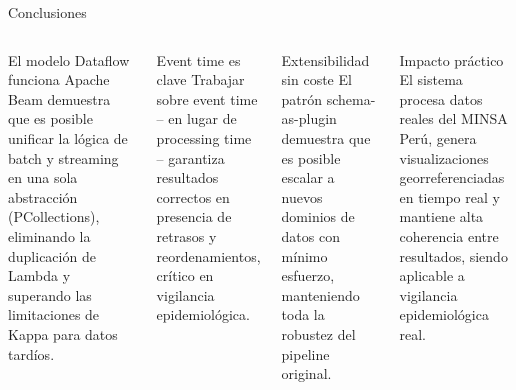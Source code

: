 \documentclass[aspectratio=169, 10pt]{beamer}
\begin{document}
\begin{frame}{Conclusiones}
  \begin{columns}[t]
      \begin{block}{El modelo Dataflow funciona}
        \small
        Apache Beam demuestra que es posible unificar
        la l\'ogica de batch y streaming en una sola abstracci\'on
        (PCollections), eliminando la duplicaci\'on de Lambda
        y superando las limitaciones de Kappa para datos tard\'ios.
      \end{block}
      \vspace{6pt}
      \begin{block}{Event time es clave}
        \small
        Trabajar sobre event time -- en lugar de processing time --
        garantiza resultados correctos en presencia de retrasos
        y reordenamientos, cr\'itico en vigilancia epidemiol\'ogica.
      \end{block}
      \begin{block}{Extensibilidad sin coste}
        \small
        El patr\'on schema-as-plugin demuestra que es posible
        escalar a nuevos dominios de datos con m\'inimo esfuerzo,
        manteniendo toda la robustez del pipeline original.
      \end{block}
      \vspace{6pt}
      \begin{exampleblock}{Impacto pr\'actico}
        \small
        El sistema procesa datos reales del MINSA Per\'u,
        genera visualizaciones georreferenciadas en tiempo real
        y mantiene alta coherencia entre resultados,
        siendo aplicable a vigilancia epidemiol\'ogica real.
      \end{exampleblock}
  \end{columns}
\end{frame}
\end{document}

